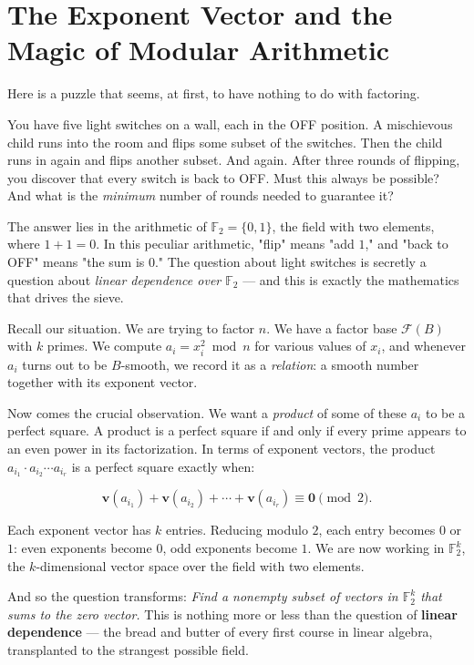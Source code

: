 \documentclass[11pt,twoside,openright]{book}
\theoremstyle{definition}
\theoremstyle{remark}
\begin{document}
\section{The Exponent Vector and the Magic of Modular Arithmetic}

Here is a puzzle that seems, at first, to have nothing to do with factoring.

You have five light switches on a wall, each in the OFF position. A mischievous child runs into the room and flips some subset of the switches. Then the child runs in again and flips another subset. And again. After three rounds of flipping, you discover that every switch is back to OFF. Must this always be possible? And what is the \textit{minimum} number of rounds needed to guarantee it?

The answer lies in the arithmetic of $\mathbb{F}_2 = \{0, 1\}$, the field with two elements, where $1 + 1 = 0$. In this peculiar arithmetic, "flip" means "add $1$," and "back to OFF" means "the sum is $0$." The question about light switches is secretly a question about \textit{linear dependence over $\mathbb{F}_2$} --- and this is exactly the mathematics that drives the sieve.

Recall our situation. We are trying to factor $n$. We have a factor base $\mathcal{F}(B)$ with $k$ primes. We compute $a_i = x_i^2 \bmod n$ for various values of $x_i$, and whenever $a_i$ turns out to be $B$-smooth, we record it as a \textit{relation}: a smooth number together with its exponent vector.

Now comes the crucial observation. We want a \textit{product} of some of these $a_i$ to be a perfect square. A product is a perfect square if and only if every prime appears to an even power in its factorization. In terms of exponent vectors, the product $a_{i_1} \cdot a_{i_2} \cdots a_{i_r}$ is a perfect square exactly when:

\[\mathbf{v}(a_{i_1}) + \mathbf{v}(a_{i_2}) + \cdots + \mathbf{v}(a_{i_r}) \equiv \mathbf{0} \pmod{2}.\]

Each exponent vector has $k$ entries. Reducing modulo $2$, each entry becomes $0$ or $1$: even exponents become $0$, odd exponents become $1$. We are now working in $\mathbb{F}_2^k$, the $k$-dimensional vector space over the field with two elements.

And so the question transforms: \textit{Find a nonempty subset of vectors in $\mathbb{F}_2^k$ that sums to the zero vector.} This is nothing more or less than the question of \textbf{linear dependence} --- the bread and butter of every first course in linear algebra, transplanted to the strangest possible field.
\end{document}
